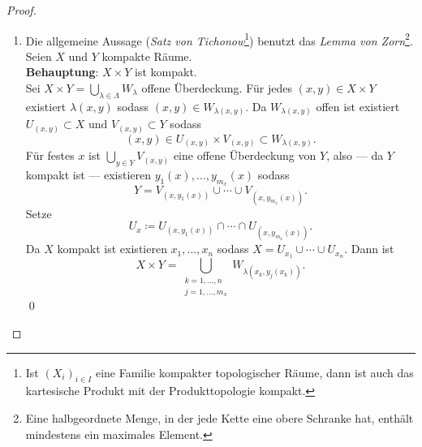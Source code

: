 \begin{theorem}
\begin{proof}
\begin{enumerate}
        Da \( X \) kompakt ist gilt:
        \begin{equation*}
          X = (X \setminus A) \cup V_{i_1} \cup \cdots \cup V_{i_k} \Rightarrow A = X \cap A
        \end{equation*}
        also
        \begin{equation*}
          A = X \cap A = \left( V_{i_1} \cup \cdots \cup V_{i_k} \right) \cap A = U_{i_1} \cup \cdots \cup U_{i_k}\text{.}
        \end{equation*}
        \qed{}
      \item Die allgemeine Aussage (\emph{Satz von Tichonow}\footnote{Ist \( {(X_i)}_{i \in I} \) eine Familie kompakter topologischer Räume, dann ist auch das kartesische Produkt mit der Produkttopologie kompakt.}) benutzt das \emph{Lemma von Zorn}\footnote{Eine halbgeordnete Menge, in der jede Kette eine obere Schranke hat, enthält mindestens ein maximales Element.}. \\
        Seien \( X \) und \( Y \) kompakte Räume. \\
        \textbf{Behauptung}: \( X \times Y \) ist kompakt. \\
        Sei \( X \times Y = \bigcup_{\lambda \in \Lambda} W_\lambda \) offene Überdeckung. Für jedes \( (x, y) \in X \times Y \) existiert \( \lambda(x, y) \) sodass \( (x,y) \in W_{\lambda(x,y)} \). Da \( W_{\lambda(x,y)} \) offen ist existiert \( U_{(x,y)} \subset X \) und \( V_{(x,y)} \subset Y \) sodass
        \begin{equation*}
          (x,y) \in U_{(x,y)} \times V_{(x,y)} \subset W_{\lambda(x,y)}\text{.}
        \end{equation*}
        Für festes \( x \) ist \( \bigcup_{y \in Y} V_{(x,y)} \) eine offene Überdeckung von \( Y \), also --- da \( Y \) kompakt ist --- existieren \( y_1(x),\dots,y_{m_x}(x) \) sodass
        \begin{equation*}
          Y = V_{(x, y_1(x))} \cup \cdots \cup V_{(x,y_{m_x}(x))}\text{.}
        \end{equation*}
        Setze
        \begin{equation*}
          U_x \coloneqq U_{(x,y_1(x))} \cap \cdots \cap U_{(x, y_{m_x}(x))}\text{.}
        \end{equation*}
        Da \( X \) kompakt ist existieren \( x_1, \dots, x_n \) sodass \( X = U_{x_1} \cup \cdots \cup U_{x_n} \). Dann ist
        \begin{equation*}
          X \times Y = \bigcup_{\substack{k = 1, \dots, n \\ j = 1, \dots, m_x}}W_{\lambda(x_k, y_j(x_k))}\text{.}
        \end{equation*}
        \qed{}
    \end{enumerate}
  \end{proof}
\end{theorem}


